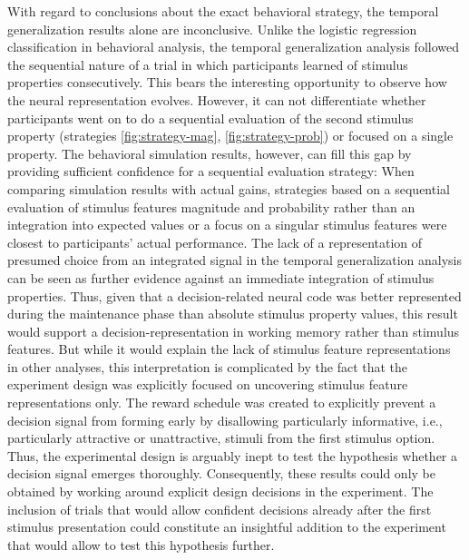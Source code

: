 With regard to conclusions about the exact behavioral strategy, the temporal generalization results alone are inconclusive.
Unlike the logistic regression classification in behavioral analysis, the temporal generalization analysis followed the sequential nature of a trial in which participants learned of stimulus properties consecutively.
This bears the interesting opportunity to observe how the neural representation evolves.
However, it can not differentiate whether participants went on to do a sequential evaluation of the second stimulus property (strategies \ref{fig:strategy-mag}, \ref{fig:strategy-prob}) or focused on a single property.
The behavioral simulation results, however, can fill this gap by providing sufficient confidence for a sequential evaluation strategy:
When comparing simulation results with actual gains, strategies based on a sequential evaluation of stimulus features magnitude and probability rather than an integration into expected values or a focus on a singular stimulus features were closest to participants' actual performance.
The lack of a representation of presumed choice from an integrated signal in the temporal generalization analysis can be seen as further evidence against an immediate integration of stimulus properties.
Thus, given that a decision-related neural code was better represented during the maintenance phase than absolute stimulus property values, this result would support a decision-representation in working memory rather than stimulus features.
But while it would explain the lack of stimulus feature representations in other analyses, this interpretation is complicated by the fact that the experiment design was explicitly focused on uncovering stimulus feature representations only.
The reward schedule was created to explicitly prevent a decision signal from forming early by disallowing particularly informative, i.e., particularly attractive or unattractive, stimuli from the first stimulus option.
Thus, the experimental design is arguably inept to test the hypothesis whether a decision signal emerges thoroughly.
Consequently, these results could only be obtained by working around explicit design decisions in the experiment.
The inclusion of trials that would allow confident decisions already after the first stimulus presentation could constitute an insightful addition to the experiment that would allow to test this hypothesis further.\\

